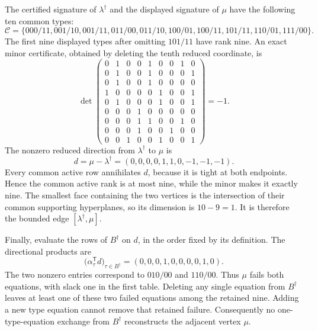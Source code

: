 The certified signature of \(\lambda^\dagger\) and the displayed signature of \(\mu\) have the following ten common types:
\[\mathcal C=\{000/11,001/10,001/11,011/00,011/10,100/01,100/11,101/11,110/01,111/00\}.\]
The first nine displayed types after omitting \(101/11\) have rank nine. An exact minor certificate, obtained by deleting the tenth reduced coordinate, is
\[\det\begin{pmatrix}0&1&0&0&1&0&0&1&0\\0&1&0&0&1&0&0&0&1\\0&1&0&0&1&0&0&0&0\\1&0&0&0&0&1&0&0&1\\0&1&0&0&0&1&0&0&1\\0&0&0&1&0&0&0&0&0\\0&0&0&1&1&0&0&1&0\\0&0&0&1&0&0&1&0&0\\0&0&1&0&0&1&0&0&1\end{pmatrix}=-1.\]
The nonzero reduced direction from \(\lambda^\dagger\) to \(\mu\) is
\[d=\mu-\lambda^\dagger=(0,0,0,0,1,1,0,-1,-1,-1).\]
Every common active row annihilates \(d\), because it is tight at both endpoints. Hence the common active rank is at most nine, while the minor makes it exactly nine. The smallest face containing the two vertices is the intersection of their common supporting hyperplanes, so its dimension is \(10-9=1\). It is therefore the bounded edge \([\lambda^\dagger,\mu]\).

Finally, evaluate the rows of \(B^\dagger\) on \(d\), in the order fixed by its definition. The directional products are
\[\bigl(\alpha_\tau^{\mathsf T}d\bigr)_{\tau\in B^\dagger}=(0,0,0,1,0,0,0,0,1,0).\]
The two nonzero entries correspond to \(010/00\) and \(110/00\). Thus \(\mu\) fails both equations, with slack one in the first table. Deleting any single equation from \(B^\dagger\) leaves at least one of these two failed equations among the retained nine. Adding a new type equation cannot remove that retained failure. Consequently no one-type-equation exchange from \(B^\dagger\) reconstructs the adjacent vertex \(\mu\).